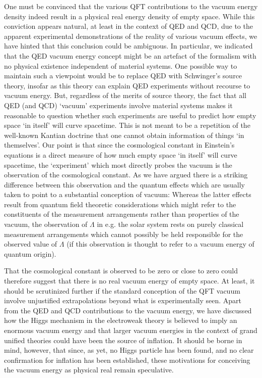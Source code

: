 \documentclass[12pt]{article}
\begin{document}
\noindent One must be convinced that the various QFT contributions
to the vacuum energy density indeed result in a physical real
energy density of empty space. While this conviction appears
natural, at least in the context of QED and QCD, due to the
apparent experimental demonstrations of the reality of various
vacuum effects, we have hinted that this conclusion could be
ambiguous. In particular, we indicated that the QED vacuum energy
concept might be an artefact of the formalism with no physical
existence independent of material systems. One possible way to
maintain such a viewpoint would be to replace QED with Schwinger's
source theory, insofar as this theory can explain QED experiments
without recourse to vacuum energy. But, regardless of the merits of
source theory, the fact that all QED (and QCD) `vacuum'
experiments involve material systems makes it reasonable to
question whether such experiments are useful to predict how empty
space `in itself' will curve spacetime. This is not meant to be a
repetition of the well-known Kantian doctrine that one cannot
obtain information of things `in themselves'. Our point is that
since the cosmological constant in Einstein's equations is a direct
measure of how much empty space `in itself' will curve spacetime,
the `experiment' which most directly probes the vacuum is the
observation of the cosmological constant. As we have argued there
is a striking difference between this observation and the quantum
effects which are usually taken to point to a substantial conception
of vacuum: Whereas the latter effects result from quantum field
theoretic considerations which might refer to the
constituents of the measurement arrangements rather than
properties of the vacuum, the observation of $\Lambda$ in e.g. the
solar system rests on purely classical measurement arrangements
which cannot possibly be held responsible for the observed value
of $\Lambda$ (if this observation is thought to refer to a vacuum
energy of quantum origin).

That the cosmological constant is observed to be zero or close to zero
could therefore suggest that there is no real vacuum energy of empty
space. At least, it should be scrutinized further if the standard
conception of the QFT vacuum involve unjustified extrapolations beyond
what is experimentally seen.  Apart from the QED and QCD contributions
to the vacuum energy, we have discussed how the Higgs mechanism in the
electroweak theory is believed to imply an enormous vacuum energy and
that larger vacuum energies in the context of grand unified theories
could have been the source of inflation.  It should be borne in mind,
however, that since, as yet, no Higgs particle has been found, and no
clear confirmation for inflation has been established, these
motivations for conceiving the vacuum energy as physical real remain
speculative.
\end{document}
